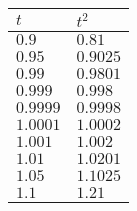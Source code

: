 \documentclass{standalone}
\author{Kelvin Chan}
\begin{document}
\begin{tabular}{l | l}
  \(t\) & \(t^{2}\) \\
  \hline
  \(0.9\) & \(0.81\) \\
  \(0.95\) & \(0.9025\) \\
  \(0.99\) & \(0.9801\) \\
  \(0.999\) & \(0.998\) \\
  \(0.9999\) & \(0.9998\) \\
  \(1.0001\) & \(1.0002\) \\
  \(1.001\) & \(1.002\) \\
  \(1.01\) & \(1.0201\) \\
  \(1.05\) & \(1.1025\) \\
  \(1.1\) & \(1.21\) \\
\end{tabular}
\end{document}
